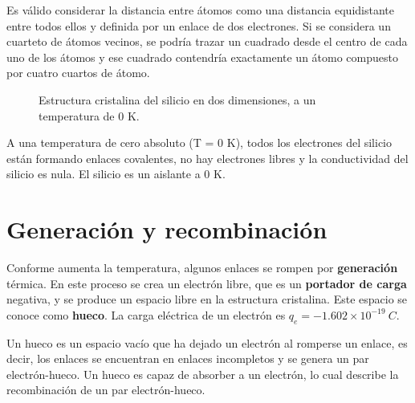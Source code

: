 Es válido considerar la distancia entre átomos como una distancia equidistante entre todos ellos y definida por un enlace de dos electrones. Si se considera un cuarteto de átomos vecinos, se podría trazar un cuadrado desde el centro de cada uno de los átomos y ese cuadrado contendría exactamente un átomo compuesto por cuatro cuartos de átomo.


\begin{figure}[H]
  \centering
  \caption{Estructura cristalina del silicio en dos dimensiones, a un temperatura de 0 K.}
  \label{fig:EstructuraCristalinaSi}
\end{figure}

A una temperatura de cero absoluto (T = 0 K), todos los electrones del silicio están formando enlaces covalentes, no hay electrones libres y la conductividad del silicio es nula. El silicio es un aislante a 0 K. 


\section{Generación y recombinación}

Conforme aumenta la temperatura, algunos enlaces se rompen por \textbf{generación} térmica. En este proceso se crea un electrón libre, que es un \textbf{portador de carga} negativa, y se produce un espacio libre en la estructura cristalina. Este espacio se conoce como \textbf{hueco}. La carga eléctrica de un electrón es $q_e=-1.602\times{}10^{-19}\ C$.

Un hueco es un espacio vacío que ha dejado un electrón al romperse un enlace, es decir, los enlaces se encuentran en enlaces incompletos y se genera un par electrón-hueco. Un hueco es capaz de absorber a un electrón, lo cual describe la recombinación de un par electrón-hueco.

